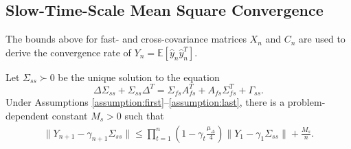 \subsection{Slow-Time-Scale Mean Square Convergence}\label{sec:slow_mse}
The bounds above for fast- and cross-covariance matrices $X_{n}$ and $C_{n}$ are used to derive the convergence rate of $Y_n = \mathbb{E}[\hat{y}_n \hat{y}_n^T]$.
\begin{lemma}\label{lem:slow_mse}
    Let $\Sigma_{ss} \succ 0$ be the unique solution to the equation
    \begin{equation}\label{eq:slow_covariance}
        \Delta \Sigma_{ss} + \Sigma_{ss} \Delta^T 
        = \Sigma_{fs} A_{fs}^T + A_{fs} \Sigma_{fs}^T + \Gamma_{ss} .         
    \end{equation}
    Under Assumptions \ref{assumption:first}--\ref{assumption:last}, there is a problem-dependent constant $M_s > 0$ such that
    \begin{align*}
    \lVert Y_{n+1} - \gamma_{n+1} \Sigma_{ss} \rVert 
    \leq 
    \prod_{t=1}^n \left(1 - \gamma_t \frac{\mu_\Delta}{4}\right) \lVert Y_1 - \gamma_1 \Sigma_{ss} \rVert 
    +
    \frac{M_s}{n}.
    \end{align*}
\end{lemma}

